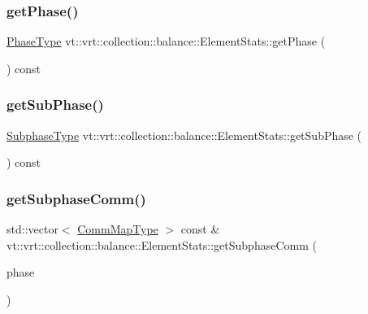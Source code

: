 \subsubsection{\texorpdfstring{get\+Phase()}{getPhase()}}
{\footnotesize\ttfamily \hyperlink{namespacevt_a46ce6733d5cdbd735d561b7b4029f6d7}{Phase\+Type} vt\+::vrt\+::collection\+::balance\+::\+Element\+Stats\+::get\+Phase (\begin{DoxyParamCaption}{ }\end{DoxyParamCaption}) const}

\mbox{\label{structvt_1_1vrt_1_1collection_1_1balance_1_1_element_stats_aa6876c8014bf0b9c9bf0061ed70ad721}} 
\subsubsection{\texorpdfstring{get\+Sub\+Phase()}{getSubPhase()}}
{\footnotesize\ttfamily \hyperlink{namespacevt_ae78cbfdf1e57470e33eedb074f2beeba}{Subphase\+Type} vt\+::vrt\+::collection\+::balance\+::\+Element\+Stats\+::get\+Sub\+Phase (\begin{DoxyParamCaption}{ }\end{DoxyParamCaption}) const}

\mbox{\label{structvt_1_1vrt_1_1collection_1_1balance_1_1_element_stats_a12d4f7166391b0e4283a287fde9d8202}} 
\subsubsection{\texorpdfstring{get\+Subphase\+Comm()}{getSubphaseComm()}}
{\footnotesize\ttfamily std\+::vector$<$ \hyperlink{namespacevt_1_1vrt_1_1collection_1_1balance_a10860c956804d644db54a16012352728}{Comm\+Map\+Type} $>$ const  \& vt\+::vrt\+::collection\+::balance\+::\+Element\+Stats\+::get\+Subphase\+Comm (\begin{DoxyParamCaption}\item[{\hyperlink{namespacevt_a46ce6733d5cdbd735d561b7b4029f6d7}{Phase\+Type}}]{phase }\end{DoxyParamCaption})}

